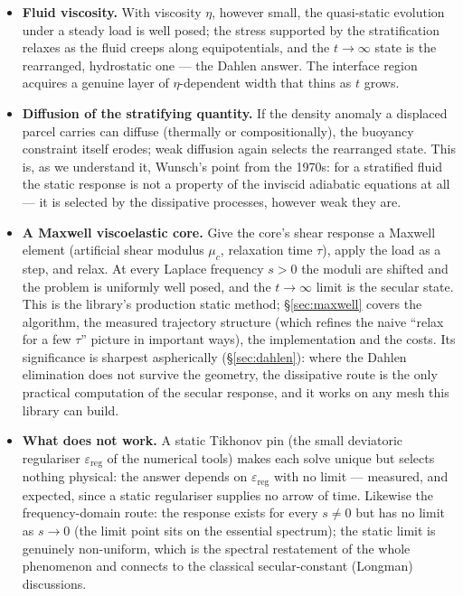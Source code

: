 \documentclass[11pt]{article}
\newcommand{\eps}{\varepsilon}
\begin{document}
\begin{itemize}
\item \textbf{Fluid viscosity.} With viscosity $\eta$, however small,
  the quasi-static evolution under a steady load is well posed; the
  stress supported by the stratification relaxes as the fluid creeps
  along equipotentials, and the $t \to \infty$ state is the
  rearranged, hydrostatic one --- the Dahlen answer. The interface
  region acquires a genuine layer of $\eta$-dependent width that
  thins as $t$ grows.
\item \textbf{Diffusion of the stratifying quantity.} If the density
  anomaly a displaced parcel carries can diffuse (thermally or
  compositionally), the buoyancy constraint itself erodes;
  weak diffusion again selects the rearranged state. This is, as we
  understand it, Wunsch's point from the 1970s: for a stratified
  fluid the static response is not a property of the inviscid
  adiabatic equations at all --- it is selected by the dissipative
  processes, however weak they are.
\item \textbf{A Maxwell viscoelastic core.} Give the core's shear
  response a Maxwell element (artificial shear modulus $\mu_c$,
  relaxation time $\tau$), apply the load as a step, and relax. At
  every Laplace frequency $s > 0$ the moduli are shifted and the
  problem is uniformly well posed, and the $t \to \infty$ limit is
  the secular state. This is the library's production static
  method; \S\ref{sec:maxwell} covers the algorithm, the measured
  trajectory structure (which refines the naive ``relax for a few
  $\tau$'' picture in important ways), the implementation and the
  costs. Its significance is sharpest aspherically
  (\S\ref{sec:dahlen}): where the Dahlen elimination does not
  survive the geometry, the dissipative route is the only practical
  computation of the secular response, and it works on any mesh this
  library can build.
\item \textbf{What does not work.} A static Tikhonov pin (the small
  deviatoric regulariser $\eps_{\mathrm{reg}}$ of the numerical
  tools) makes each solve unique but selects nothing physical: the
  answer depends on $\eps_{\mathrm{reg}}$ with no limit --- measured,
  and expected, since a static regulariser supplies no arrow of time.
  Likewise the frequency-domain route: the response exists for every
  $s \neq 0$ but has no limit as $s \to 0$ (the limit point
  sits on the essential spectrum); the static limit is genuinely
  non-uniform, which is the spectral restatement of the whole
  phenomenon and connects to the classical secular-constant
  (Longman) discussions.
\end{itemize}
\end{document}

